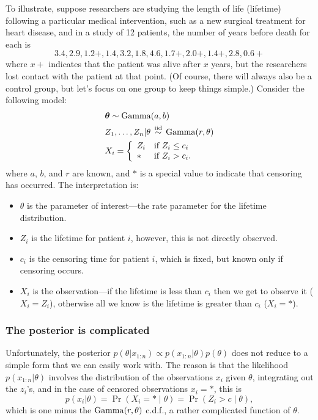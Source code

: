 \documentclass[12pt]{article}
\begin{document}
To illustrate, suppose researchers are studying the length of life (lifetime) following a particular medical intervention, such as a new surgical treatment for heart disease, and in a study of 12 patients, the number of years before death for each is
$$3.4, 2.9, 1.2+, 1.4, 3.2, 1.8, 4.6, 1.7+, 2.0+, 1.4+, 2.8, 0.6+$$
where $x+$ indicates that the patient was alive after $x$ years, but the researchers lost contact with the patient at that point. (Of
course, there will always also be a control group, but let's focus on one group to keep things simple.) Consider the following model:
\begin{align*}
    &{\bm\theta}\sim \operatorname*{Gamma}(a, b)\\
    &Z_1,\ldots,Z_n|\theta\,\stackrel{\mathrm{iid}}{\sim}\,\operatorname*{Gamma}(r,\theta)\\
    &X_i = \left\{ \begin{array}{ll} Z_i & \mbox{if } Z_i\leq c_i \\ \ast & \mbox{if } Z_i > c_i. \end{array} \right.
\end{align*}
where $a$, $b$, and $r$ are known, and $\ast$ is a special value to indicate that censoring has occurred.  The interpretation is:
\begin{itemize}
    \item $\theta$ is the parameter of interest---the rate parameter for the lifetime distribution.
    \item $Z_i$ is the lifetime for patient $i$, however, this is not directly observed.
    \item $c_i$ is the censoring time for patient $i$, which is fixed, but known only if censoring occurs.
    \item $X_i$ is the observation---if the lifetime is less than $c_i$ then we get to observe it ($X_i = Z_i$), otherwise
        all we know is the lifetime is greater than $c_i$ ($X_i = \ast$).
\end{itemize}

\subsubsection{The posterior is complicated}
Unfortunately, the posterior $p(\theta|x_{1:n}) \propto p(x_{1:n}|\theta)p(\theta)$ does not reduce to a simple form that we can easily work with. The reason is that the likelihood $p(x_{1:n}|\theta)$ involves the distribution of the observations $x_i$ given $\theta$, integrating out the $z_i$'s, and in the case of censored observations $x_i=\ast$, this is
$$p(x_i|\theta) = \Pr(X_i = \ast \mid \theta) = \Pr(Z_i>c\mid \theta),$$
which is one minus the $\operatorname*{Gamma}(r,\theta)$ c.d.f., a rather complicated function of $\theta$.
\end{document}
